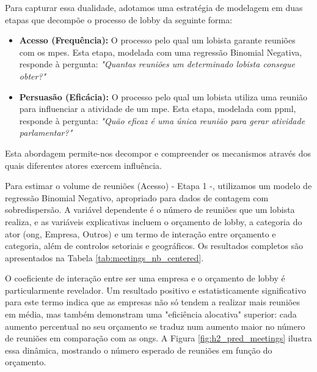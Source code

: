 Para capturar essa dualidade, adotamos uma estratégia de modelagem em duas etapas que decompõe o processo de lobby da seguinte forma:
\begin{itemize}
    \item \textbf{Acesso (Frequência):} O processo pelo qual um lobista garante reuniões com os \acrshort{mpe}s. Esta etapa, modelada com uma regressão Binomial Negativa, responde à pergunta: \textit{"Quantas reuniões um determinado lobista consegue obter?"}
    \item \textbf{Persuasão (Eficácia):} O processo pelo qual um lobista utiliza uma reunião para influenciar a atividade de um \acrshort{mpe}. Esta etapa, modelada com \acrshort{ppml}, responde à pergunta: \textit{"Quão eficaz é uma única reunião para gerar atividade parlamentar?"}
\end{itemize}

Esta abordagem permite-nos decompor e compreender os mecanismos através dos quais diferentes atores exercem influência.

Para estimar o volume de reuniões (Acesso) - Etapa 1 -, utilizamos um modelo de regressão Binomial Negativo, apropriado para dados de contagem com sobredispersão. A variável dependente é o número de reuniões que um lobista realiza, e as variáveis explicativas incluem o orçamento de lobby, a categoria do ator (\acrshort{ong}, Empresa, Outros) e um termo de interação entre orçamento e categoria, além de controlos setoriais e geográficos. Os resultados completos são apresentados na Tabela \ref{tab:meetings_nb_centered}.

O coeficiente de interação entre ser uma empresa e o orçamento de lobby é particularmente revelador. Um resultado positivo e estatisticamente significativo para este termo indica que as empresas não só tendem a realizar mais reuniões em média, mas também demonstram uma "eficiência alocativa" superior: cada aumento percentual no seu orçamento se traduz num aumento maior no número de reuniões em comparação com as \acrshort{ong}s. A Figura \ref{fig:h2_pred_meetings} ilustra essa dinâmica, mostrando o número esperado de reuniões em função do orçamento.

